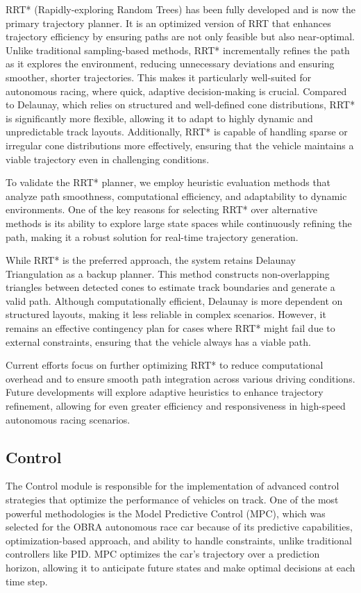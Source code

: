 \documentclass[a4paper,11pt]{report}
\begin{document}
RRT* (Rapidly-exploring Random Trees) has been fully developed and is now the primary trajectory planner. It is an optimized version of RRT that enhances trajectory efficiency by ensuring paths are not only feasible but also near-optimal. Unlike traditional sampling-based methods, RRT* incrementally refines the path as it explores the environment, reducing unnecessary deviations and ensuring smoother, shorter trajectories. This makes it particularly well-suited for autonomous racing, where quick, adaptive decision-making is crucial. Compared to Delaunay, which relies on structured and well-defined cone distributions, RRT* is significantly more flexible, allowing it to adapt to highly dynamic and unpredictable track layouts. Additionally, RRT* is capable of handling sparse or irregular cone distributions more effectively, ensuring that the vehicle maintains a viable trajectory even in challenging conditions.

To validate the RRT* planner, we employ heuristic evaluation methods that analyze path smoothness, computational efficiency, and adaptability to dynamic environments. One of the key reasons for selecting RRT* over alternative methods is its ability to explore large state spaces while continuously refining the path, making it a robust solution for real-time trajectory generation.

While RRT* is the preferred approach, the system retains Delaunay Triangulation as a backup planner. This method constructs non-overlapping triangles between detected cones to estimate track boundaries and generate a valid path. Although computationally efficient, Delaunay is more dependent on structured layouts, making it less reliable in complex scenarios. However, it remains an effective contingency plan for cases where RRT* might fail due to external constraints, ensuring that the vehicle always has a viable path.

Current efforts focus on further optimizing RRT* to reduce computational overhead and to ensure smooth path integration across various driving conditions. Future developments will explore adaptive heuristics to enhance trajectory refinement, allowing for even greater efficiency and responsiveness in high-speed autonomous racing scenarios.

\subsection{Control}

The Control module is responsible for the implementation of advanced control strategies that optimize the performance of vehicles on track. One of the most powerful methodologies is the Model Predictive Control (MPC), which was selected for the OBRA autonomous race car because of its predictive capabilities, optimization-based approach, and ability to handle constraints, unlike traditional controllers like PID. MPC optimizes the car's trajectory over a prediction horizon, allowing it to anticipate future states and make optimal decisions at each time step.
\end{document}
